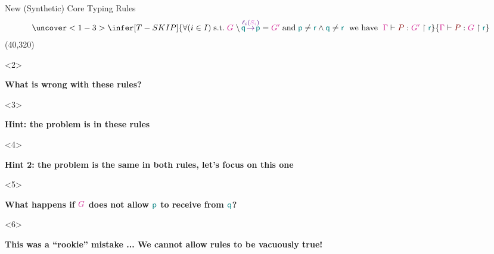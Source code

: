 \begin{frame}{New (Synthetic) Core Typing Rules}
{\begin{displaymath}
\begin{array}{c}
  \uncover<1-3>{%
  \infer[T-SKIP]
  {
    \forall (i \in I) \; \text{s.t.} \; \greduce G {\annlbl \Rq \Rp {\lbl_i(\expt{S_i})}} {G'}
    \; \text{and} \; \Rp \neq \Rr \wedge \Rq \neq \Rr
    \;\text{ we have }\;
    \poft \Gamma {P} {G'} \Rr }
  {\poft \Gamma P G \Rr}
  }
  \end{array}
\end{displaymath}
}
  \Put(40,320){%
    \begin{onlyenv}<2>
    \begin{minipage}{.86\columnwidth}
    \begin{infobox}
      \LARGE
      \textbf{What is wrong with these rules?}
    \end{infobox}
    \end{minipage}
    \end{onlyenv}
    \begin{onlyenv}<3>
    \begin{minipage}{.86\columnwidth}
    \begin{infobox}
      \LARGE
      \textbf{Hint: the problem is in these rules}
    \end{infobox}
    \end{minipage}
    \end{onlyenv}
    \begin{onlyenv}<4>
    \begin{minipage}{.86\columnwidth}
    \begin{infobox}
      \LARGE
      \textbf{Hint 2: the problem is the same in both rules, let's focus on this one}
    \end{infobox}
    \end{minipage}
    \end{onlyenv}
    \begin{onlyenv}<5>
    \begin{minipage}{.86\columnwidth}
    \begin{infobox}
      \LARGE
      \textbf{What happens if $\globalt{G}$ does not allow $\Rp$ to receive from $\Rq$?}
    \end{infobox}
    \end{minipage}
    \end{onlyenv}
    \begin{onlyenv}<6>
    \begin{minipage}{.86\columnwidth}
    \begin{infobox}
      \LARGE
      \textbf{This was a ``rookie'' mistake ... We cannot allow rules to be vacuously true!}
    \end{infobox}
    \end{minipage}
    \end{onlyenv}
  }
\end{frame}


